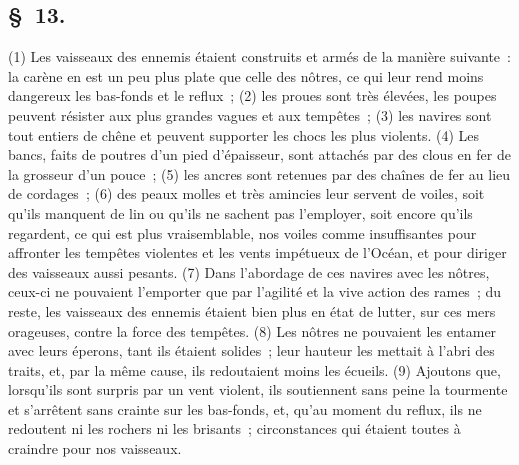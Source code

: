 \documentclass[french,twoside]{book} %
\begin{document}
\subsection[{§ 13.}]{ \textsc{§ 13.} }
\noindent (1) Les vaisseaux des ennemis étaient construits et armés de la manière suivante : la carène en est un peu plus plate que celle des nôtres, ce qui leur rend moins dangereux les bas-fonds et le reflux ; (2) les proues sont très élevées, les poupes peuvent résister aux plus grandes vagues et aux tempêtes ; (3) les navires sont tout entiers de chêne et peuvent supporter les chocs les plus violents. (4) Les bancs, faits de poutres d’un pied d’épaisseur, sont attachés par des clous en fer de la grosseur d’un pouce ; (5) les ancres sont retenues par des chaînes de fer au lieu de cordages ; (6) des peaux molles et très amincies leur servent de voiles, soit qu’ils manquent de lin ou qu’ils ne sachent pas l’employer, soit encore qu’ils regardent, ce qui est plus vraisemblable, nos voiles comme insuffisantes pour affronter les tempêtes violentes et les vents impétueux de l’Océan, et pour diriger des vaisseaux aussi pesants. (7) Dans l’abordage de ces navires avec les nôtres, ceux-ci ne pouvaient l’emporter que par l’agilité et la vive action des rames ; du reste, les vaisseaux des ennemis étaient bien plus en état de lutter, sur ces mers orageuses, contre la force des tempêtes. (8) Les nôtres ne pouvaient les entamer avec leurs éperons, tant ils étaient solides ; leur hauteur les mettait à l’abri des traits, et, par la même cause, ils redoutaient moins les écueils. (9) Ajoutons que, lorsqu’ils sont surpris par un vent violent, ils soutiennent sans peine la tourmente et s’arrêtent sans crainte sur les bas-fonds, et, qu’au moment du reflux, ils ne redoutent ni les rochers ni les brisants ; circonstances qui étaient toutes à craindre pour nos vaisseaux.
\end{document}
